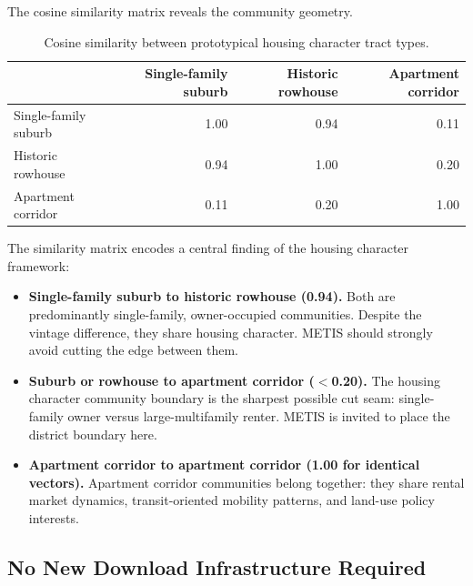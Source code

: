 The cosine similarity matrix reveals the community geometry.

\begin{table}[ht]
\centering
\caption{Cosine similarity between prototypical housing character tract types.}
\label{tab:similarity}
\begin{tabular}{lrrr}
\toprule
 & Single-family suburb & Historic rowhouse & Apartment corridor \\
\midrule
Single-family suburb & 1.00 & 0.94 & 0.11 \\
Historic rowhouse    & 0.94 & 1.00 & 0.20 \\
Apartment corridor   & 0.11 & 0.20 & 1.00 \\
\bottomrule
\end{tabular}
\end{table}

The similarity matrix encodes a central finding of the housing character framework:
\begin{itemize}
  \item \textbf{Single-family suburb to historic rowhouse (0.94).}
    Both are predominantly single-family, owner-occupied communities.
    Despite the vintage difference, they share housing character.
    METIS should strongly avoid cutting the edge between them.
  \item \textbf{Suburb or rowhouse to apartment corridor ($<$0.20).}
    The housing character community boundary is the sharpest possible
    cut seam: single-family owner versus large-multifamily renter.
    METIS is invited to place the district boundary here.
  \item \textbf{Apartment corridor to apartment corridor (1.00 for identical vectors).}
    Apartment corridor communities belong together: they share rental market
    dynamics, transit-oriented mobility patterns, and land-use policy interests.
\end{itemize}

\subsection{No New Download Infrastructure Required}

